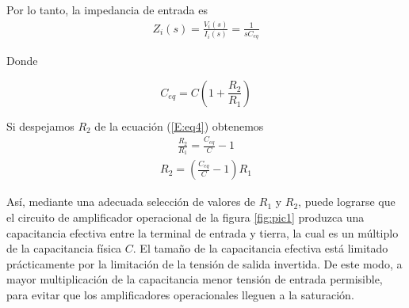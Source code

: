 \documentclass[12pt,a4paper]{article}
\begin{document}
	Por lo tanto, la impedancia de entrada es
	\begin{align}
		\label{E:eq3}
		Z_i(s) = \frac{V_i(s)}{I_i(s)} = \frac{1}{sC_{eq}}
	\end{align}

	Donde
	\begin{tcolorbox}[colback=red!5!white,colframe=red!75!black]
		\begin{equation}
			\label{E:eq4}
			C_{eq} = C\left( 1 + \frac{R_2}{R_1} \right)
		\end{equation}
	\end{tcolorbox}
	
	Si despejamos $R_2$ de la ecuación (\ref{E:eq4}) obtenemos
	\begin{align}
		\frac{R_2}{R_1} = \frac{C_{eq}}{C} - 1\nonumber
	\end{align}
	\begin{align}
		\label{E:eq5}
		R_2 = \left( \frac{C_{eq}}{C} - 1 \right)R_1
	\end{align}

	Así, mediante una adecuada selección de valores de $R_1$ y $R_2$, puede lograrse que el circuito de amplificador operacional de la figura \ref{fig:pic1} produzca una capacitancia efectiva entre la terminal de entrada y tierra, la cual es un múltiplo de la capacitancia física $C$. El tamaño de la capacitancia efectiva está limitado prácticamente por la limitación de la tensión de salida invertida. De este modo, a mayor multiplicación de la capacitancia menor tensión de entrada permisible, para evitar que los amplificadores operacionales lleguen a la saturación.
	\newpage
	
\end{document}
